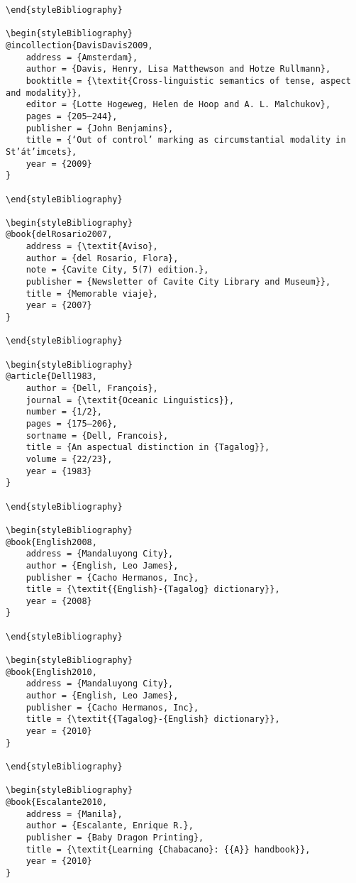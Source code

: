 \begin{stylelsUnNumberedSection}
\begin{verbatim}
\end{styleBibliography}

\begin{styleBibliography}
@incollection{DavisDavis2009,
	address = {Amsterdam},
	author = {Davis, Henry, Lisa Matthewson and Hotze Rullmann},
	booktitle = {\textit{Cross-linguistic semantics of tense, aspect and modality}},
	editor = {Lotte Hogeweg, Helen de Hoop and A. L. Malchukov},
	pages = {205–244},
	publisher = {John Benjamins},
	title = {‘Out of control’ marking as circumstantial modality in St’át’imcets},
	year = {2009}
}

\end{styleBibliography}

\begin{styleBibliography}
@book{delRosario2007,
	address = {\textit{Aviso},
	author = {del Rosario, Flora},
	note = {Cavite City, 5(7) edition.},
	publisher = {Newsletter of Cavite City Library and Museum}},
	title = {Memorable viaje},
	year = {2007}
}

\end{styleBibliography}

\begin{styleBibliography}
@article{Dell1983,
	author = {Dell, François},
	journal = {\textit{Oceanic Linguistics}},
	number = {1/2},
	pages = {175–206},
	sortname = {Dell, Francois},
	title = {An aspectual distinction in {Tagalog}},
	volume = {22/23},
	year = {1983}
}

\end{styleBibliography}

\begin{styleBibliography}
@book{English2008,
	address = {Mandaluyong City},
	author = {English, Leo James},
	publisher = {Cacho Hermanos, Inc},
	title = {\textit{{English}-{Tagalog} dictionary}},
	year = {2008}
}

\end{styleBibliography}

\begin{styleBibliography}
@book{English2010,
	address = {Mandaluyong City},
	author = {English, Leo James},
	publisher = {Cacho Hermanos, Inc},
	title = {\textit{{Tagalog}-{English} dictionary}},
	year = {2010}
}

\end{styleBibliography}

\begin{styleBibliography}
@book{Escalante2010,
	address = {Manila},
	author = {Escalante, Enrique R.},
	publisher = {Baby Dragon Printing},
	title = {\textit{Learning {Chabacano}: {{A}} handbook}},
	year = {2010}
}


\end{verbatim}
\end{stylelsUnNumberedSection}
